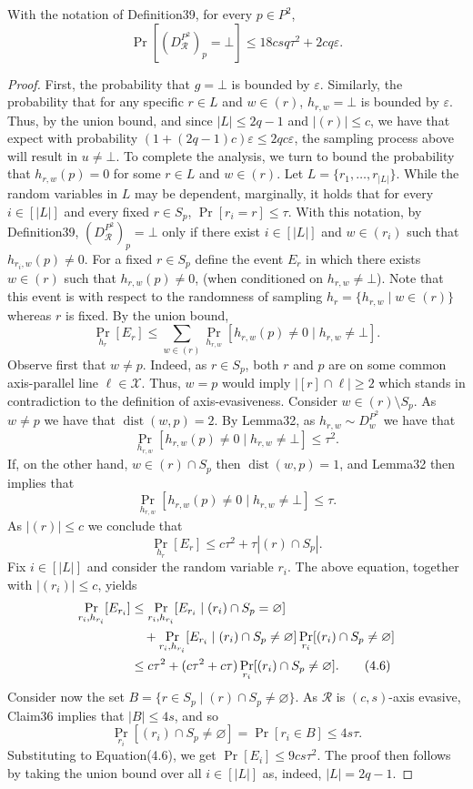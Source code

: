 \begin{ntclaim}
With the notation of Definition39, for every $p\in P^2$,
\[\Pr[(D_{\mathcal R}^{P^2})_p=\bot]\leq18csq\tau^2+2cq\varepsilon.\]
\end{ntclaim}
\begin{proof}
First, the probability that $g=\bot$ is bounded by $\varepsilon$. Similarly, the probability that for any specific $r\in L$ and $w\in(r)$, $h_{r,w}=\bot$ is bounded by $\varepsilon$. Thus, by the union bound, and since $|L|\leq2q-1$ and $|(r)|\leq c$, we have that expect with probability $(1+(2q-1)c)\varepsilon\leq2qc\varepsilon$, the sampling process above will result in $u\ne\bot$.
To complete the analysis, we turn to bound the probability that $h_{r,w}(p)=0$ for some $r\in L$ and $w\in(r)$. Let $L=\{r_1,\ldots,r_{|L|}\}$. While the random variables in $L$ may be dependent, marginally, it holds that for every $i\in[|L|]$ and every fixed $r\in S_p$, $\Pr[r_i=r]\leq\tau$. With this notation, by Definition39, $(D_{\mathcal R}^{P^2})_p=\bot$ only if there exist $i\in[|L|]$ and $w\in(r_i)$ such that $h_{r_i,w}(p)\ne0$.
For a fixed $r\in S_p$ define the event $E_r$ in which there exists $w\in(r)$ such that $h_{r,w}(p)\ne0$, (when conditioned on $h_{r,w}\ne\bot$). Note that this event is with respect to the randomness of sampling $h_r=\{h_{r,w}\mid w\in(r)\}$ whereas $r$ is fixed. By the union bound,
\[\Pr_{h_r}[E_r]\leq\sum_{w\in(r)}\Pr_{h_{r,w}}[h_{r,w}(p)\ne0\mid h_{r,w}\ne\bot].\]
Observe first that $w\ne p$. Indeed, as $r\in S_p$, both $r$ and $p$ are on some common axis-parallel line $\ell\in\mathcal X$. Thus, $w=p$ would imply $|[r]\cap\ell|\geq2$ which stands in contradiction to the definition of axis-evasiveness. Consider $w\in(r)\setminus S_p$. As $w\ne p$ we have that $\operatorname{dist}(w,p)=2$. By Lemma32, as $h_{r,w}\sim D_w^{P^2}$ we have that
\[\Pr_{h_{r,w}}[h_{r,w}(p)\ne0\mid h_{r,w}\ne\bot]\leq\tau^2.\]
If, on the other hand, $w\in(r)\cap S_p$ then $\operatorname{dist}(w,p)=1$, and Lemma32 then implies that
\[\Pr_{h_{r,w}}[h_{r,w}(p)\ne0\mid h_{r,w}\ne\bot]\leq\tau.\]
As $|(r)|\leq c$ we conclude that
\[\Pr_{h_r}[E_r]\leq c\tau^2+\tau|(r)\cap S_p|.\]
Fix $i\in[|L|]$ and consider the random variable $r_i$. The above equation, together with $|(r_i)|\leq c$, yields
\begin{align}\Pr_{r_i,h_{r_i}}[E_{r_i}]&\leq\Pr_{r_i,h_{r_i}}[E_{r_i}\mid(r_i)\cap S_p=\varnothing]\notag\\&\quad+\Pr_{r_i,h_{r_i}}[E_{r_i}\mid(r_i)\cap S_p\ne\varnothing]\Pr_{r_i}[(r_i)\cap S_p\ne\varnothing]\notag\\&\leq c\tau^2+(c\tau^2+c\tau)\Pr_{r_i}[(r_i)\cap S_p\ne\varnothing].\tag{4.6}\end{align}
Consider now the set $B=\{r\in S_p\mid(r)\cap S_p\ne\varnothing\}$. As $\mathcal R$ is $(c,s)$-axis evasive, Claim36 implies that $|B|\leq4s$, and so
\[\Pr_{r_i}[(r_i)\cap S_p\ne\varnothing]=\Pr[r_i\in B]\leq4s\tau.\]
Substituting to Equation(4.6), we get $\Pr[E_i]\leq9cs\tau^2$. The proof then follows by taking the union bound over all $i\in[|L|]$ as, indeed, $|L|=2q-1$.
\end{proof}

